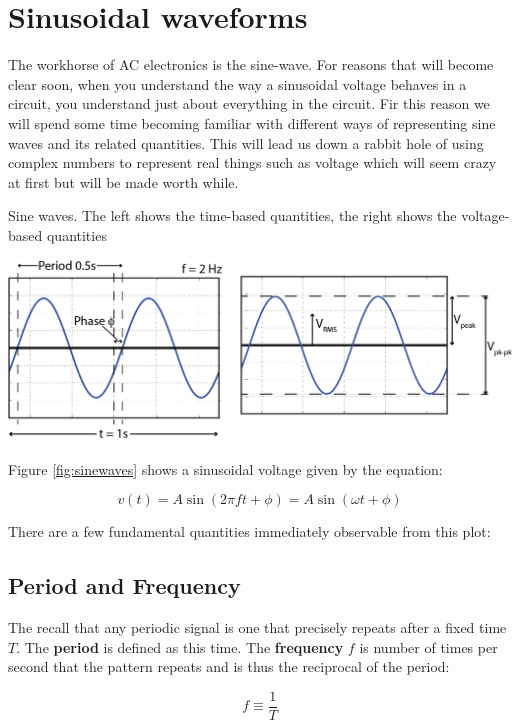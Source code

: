 \documentclass{tufte-book}
\begin{document}
\section{Sinusoidal waveforms}
The workhorse of AC electronics is the sine-wave. For reasons that will become clear soon, when you understand the way a sinusoidal voltage behaves in a circuit, you understand just about everything in the circuit. Fir this reason we will spend some time becoming familiar with different ways of representing sine waves and its related quantities. This will lead us down a rabbit hole of using complex numbers to represent real things such as voltage which will seem crazy at first but will be made worth while. 

\begin{marginfigure}
\caption{Sine waves. The left shows the time-based quantities, the right shows the voltage-based quantities}
\label{fig:sinewaves}
\includegraphics[width=\textwidth]{sinewavez}
\end{marginfigure}


Figure \ref{fig:sinewaves} shows a sinusoidal voltage given by the equation:

\begin{equation}\label{eq:sinus}
v(t) = A\sin(2\pi f t + \phi) = A\sin(\omega t +\phi)
\end{equation}

There are a few fundamental quantities immediately observable from this plot:

\subsection{Period and Frequency}
The recall that any periodic signal is one that precisely repeats after a fixed time $T$. The \textbf{period} is defined as this time. The \textbf{frequency} $f$ is number of times per second that the pattern repeats and is thus the reciprocal of the period:

\begin{equation}\label{def:frequency}
f \equiv\frac{1}{T}
\end{equation}
\end{document}
